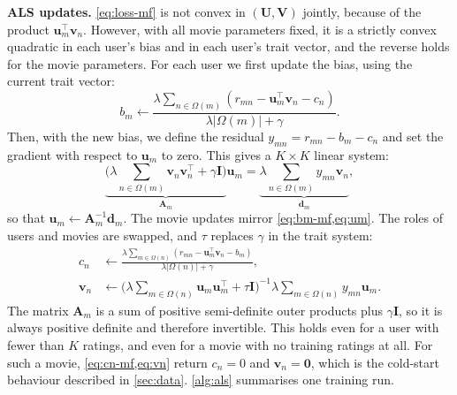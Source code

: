 \documentclass{article}
\theoremstyle{plain}
\theoremstyle{definition}
\theoremstyle{remark}
\begin{document}
\textbf{ALS updates.}
\cref{eq:loss-mf} is not convex in $(\mathbf{U}, \mathbf{V})$ jointly,
because of the product $\mathbf{u}_m^\top \mathbf{v}_n$. However, with all
movie parameters fixed, it is a strictly convex quadratic in each user's
bias and in each user's trait vector, and the reverse holds for the movie
parameters. For each user we first update the bias, using the current
trait vector:
\begin{equation}
  b_m \leftarrow
  \frac{\lambda \sum_{n \in \Omega(m)}
        \left( r_{mn} - \mathbf{u}_m^\top \mathbf{v}_n - c_n \right)}
       {\lambda |\Omega(m)| + \gamma} .
  \label{eq:bm-mf}
\end{equation}
Then, with the new bias, we define the residual
$y_{mn} = r_{mn} - b_m - c_n$ and set the gradient with respect to
$\mathbf{u}_m$ to zero. This gives a $K \times K$ linear system:
\begin{equation}
  \underbrace{\Big( \lambda \!\! \sum_{n \in \Omega(m)} \!\!
      \mathbf{v}_n \mathbf{v}_n^\top + \gamma \mathbf{I} \Big)}_{\mathbf{A}_m}
  \mathbf{u}_m
  = \underbrace{\lambda \!\! \sum_{n \in \Omega(m)} \!\! y_{mn} \mathbf{v}_n}_{\mathbf{d}_m} ,
  \label{eq:um}
\end{equation}
so that $\mathbf{u}_m \leftarrow \mathbf{A}_m^{-1} \mathbf{d}_m$.
The movie updates mirror \cref{eq:bm-mf,eq:um}. The roles of users and
movies are swapped, and $\tau$ replaces $\gamma$ in the trait system:
\begin{align}
  c_n &\leftarrow
  \frac{\lambda \sum_{m \in \Omega(n)}
        \left( r_{mn} - \mathbf{u}_m^\top \mathbf{v}_n - b_m \right)}
       {\lambda |\Omega(n)| + \gamma} ,
  \label{eq:cn-mf} \\
  \mathbf{v}_n &\leftarrow
  \Big( \lambda \!\! \sum_{m \in \Omega(n)} \!\!
      \mathbf{u}_m \mathbf{u}_m^\top + \tau \mathbf{I} \Big)^{-1}
  \lambda \!\! \sum_{m \in \Omega(n)} \!\! y_{mn} \mathbf{u}_m .
  \label{eq:vn}
\end{align}
The matrix $\mathbf{A}_m$ is a sum of positive semi-definite outer products
plus $\gamma\mathbf{I}$, so it is always positive definite and therefore
invertible. This holds even for a user with fewer than $K$ ratings, and even
for a movie with no training ratings at all. For such a movie,
\cref{eq:cn-mf,eq:vn} return $c_n = 0$ and $\mathbf{v}_n = \mathbf{0}$,
which is the cold-start behaviour described in \cref{sec:data}.
\cref{alg:als} summarises one training run.
\end{document}
